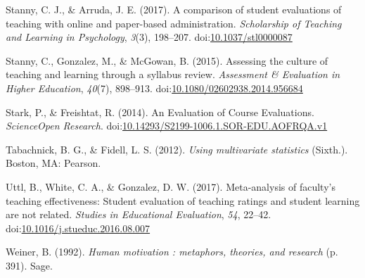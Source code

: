 \documentclass[man]{apa6}
\theoremstyle{definition}
\theoremstyle{definition}
\theoremstyle{definition}
\theoremstyle{remark}
\begin{document}
\hypertarget{ref-Stanny2017}{}
Stanny, C. J., \& Arruda, J. E. (2017). A comparison of student
evaluations of teaching with online and paper-based administration.
\emph{Scholarship of Teaching and Learning in Psychology}, \emph{3}(3),
198--207.
doi:\href{https://doi.org/10.1037/stl0000087}{10.1037/stl0000087}

\hypertarget{ref-Stanny2015}{}
Stanny, C., Gonzalez, M., \& McGowan, B. (2015). Assessing the culture
of teaching and learning through a syllabus review. \emph{Assessment \&
Evaluation in Higher Education}, \emph{40}(7), 898--913.
doi:\href{https://doi.org/10.1080/02602938.2014.956684}{10.1080/02602938.2014.956684}

\hypertarget{ref-Stark2014}{}
Stark, P., \& Freishtat, R. (2014). An Evaluation of Course Evaluations.
\emph{ScienceOpen Research}.
doi:\href{https://doi.org/10.14293/S2199-1006.1.SOR-EDU.AOFRQA.v1}{10.14293/S2199-1006.1.SOR-EDU.AOFRQA.v1}

\hypertarget{ref-Tabachnick2012}{}
Tabachnick, B. G., \& Fidell, L. S. (2012). \emph{Using multivariate
statistics} (Sixth.). Boston, MA: Pearson.

\hypertarget{ref-Uttl2017}{}
Uttl, B., White, C. A., \& Gonzalez, D. W. (2017). Meta-analysis of
faculty's teaching effectiveness: Student evaluation of teaching ratings
and student learning are not related. \emph{Studies in Educational
Evaluation}, \emph{54}, 22--42.
doi:\href{https://doi.org/10.1016/j.stueduc.2016.08.007}{10.1016/j.stueduc.2016.08.007}

\hypertarget{ref-Weiner1992}{}
Weiner, B. (1992). \emph{Human motivation : metaphors, theories, and
research} (p. 391). Sage.
\end{document}
